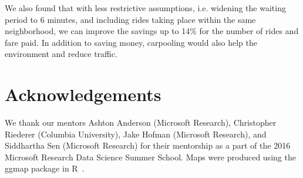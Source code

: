 \documentclass[twocolumn]{article}
\begin{document}
We also found that with less restrictive assumptions, i.e. widening the waiting period to 6 minutes, and including rides taking place within the same neighborhood, we can improve the savings up to 14\% for the number of rides and fare paid. In addition to saving money, carpooling would also help the environment and reduce traffic.

\section{Acknowledgements}
We thank our mentors Ashton Anderson (Microsoft Research), Christopher Riederer (Columbia University), Jake Hofman (Microsoft Research), and Siddhartha Sen (Microsoft Research) for their mentorship as a part of the 2016 Microsoft Research Data Science Summer School. Maps were produced using the ggmap package in R~\cite{KAHLE:2013}.



\end{document}
